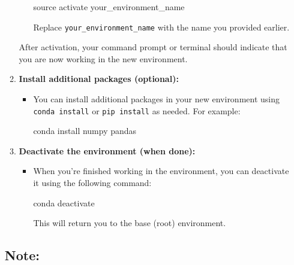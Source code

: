 \documentclass[
  letterpaper,
  DIV=11,
  numbers=noendperiod]{scrreprt}
\newenvironment{Shaded}{\begin{snugshade}}{\end{snugshade}}
\newcommand{\BuiltInTok}[1]{\textcolor[rgb]{0.00,0.23,0.31}{#1}}
\newcommand{\ExtensionTok}[1]{\textcolor[rgb]{0.00,0.23,0.31}{#1}}
\newcommand{\NormalTok}[1]{\textcolor[rgb]{0.00,0.23,0.31}{#1}}
\begin{document}
\begin{enumerate}
\begin{enumerate}
\begin{itemize}
\begin{Shaded}
\begin{Highlighting}[]
\BuiltInTok{source}\NormalTok{ activate your\_environment\_name}
\end{Highlighting}
\end{Shaded}

      Replace \texttt{your\_environment\_name} with the name you
      provided earlier.
    \end{itemize}

    After activation, your command prompt or terminal should indicate
    that you are now working in the new environment.
  \item
    \textbf{Install additional packages (optional):}

    \begin{itemize}
    \item
      You can install additional packages in your new environment using
      \texttt{conda\ install} or \texttt{pip\ install} as needed. For
      example:

\begin{Shaded}
\begin{Highlighting}[]
\ExtensionTok{conda}\NormalTok{ install numpy pandas}
\end{Highlighting}
\end{Shaded}
    \end{itemize}
  \item
    \textbf{Deactivate the environment (when done):}

    \begin{itemize}
    \item
      When you're finished working in the environment, you can
      deactivate it using the following command:

\begin{Shaded}
\begin{Highlighting}[]
\ExtensionTok{conda}\NormalTok{ deactivate}
\end{Highlighting}
\end{Shaded}

      This will return you to the base (root) environment.
    \end{itemize}
  \end{enumerate}

  \subsection{Note:}\label{note}


\end{enumerate}
\end{document}
